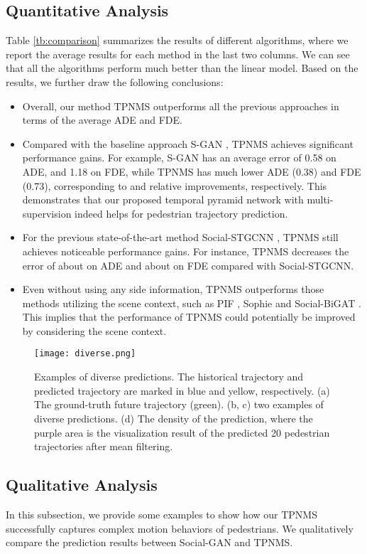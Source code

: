 \documentclass[letterpaper]{article} \usepackage{aaai21}  \usepackage{times}  \usepackage{helvet} \usepackage{courier}  \usepackage[hyphens]{url}  \usepackage{graphicx} \urlstyle{rm} \def\UrlFont{\rm}  \usepackage{natbib}  \usepackage{caption} \frenchspacing  \setlength{\pdfpagewidth}{8.5in}  \setlength{\pdfpageheight}{11in}
\begin{document}
\subsection{Quantitative Analysis}
Table \ref{tb:comparison} summarizes the results of different algorithms, where we report the average results for each method in the last two columns. We can see that all the algorithms perform much better than the linear model. Based on the results, we further draw the following conclusions:
\begin{itemize}
	\item Overall, our method TPNMS outperforms all the previous approaches in terms of the average ADE and FDE. 
	\item Compared with the baseline approach S-GAN \cite{gupta2018social}, TPNMS achieves significant performance gains. For example, S-GAN has an average error of 0.58 on ADE, and 1.18 on FDE, while TPNMS has much lower ADE (0.38) and FDE (0.73), corresponding to  and  relative improvements, respectively. This demonstrates that our proposed temporal pyramid network with multi-supervision indeed helps for pedestrian trajectory prediction.
	\item For the previous state-of-the-art method Social-STGCNN \cite{mohamed2020social}, TPNMS still achieves noticeable performance gains. For instance, TPNMS decreases the error of about  on ADE and about  on FDE compared with Social-STGCNN.
\item Even without using any side information, TPNMS outperforms those methods utilizing the scene context, such as PIF \cite{liang2019peeking}, Sophie \cite{sadeghian2019sophie} and Social-BiGAT \cite{socialbigat2019}. This implies that the performance of TPNMS could potentially be improved by considering the scene context.
\end{itemize}

\begin{figure*}[!t]
	\centering
	\texttt{[image: diverse.png]}
\caption{Examples of diverse predictions. The historical trajectory and predicted trajectory are marked in blue and yellow, respectively.
(a) The ground-truth future trajectory (green). (b, c) two examples of diverse predictions. (d) The density of the prediction, where the purple area is the visualization result of the predicted 20 pedestrian trajectories after mean filtering.}
	\label{fig:diverse}
\end{figure*}
\subsection{Qualitative Analysis}
In this subsection, we provide some examples to show how our TPNMS successfully captures complex motion behaviors of pedestrians.
We qualitatively compare the prediction results between Social-GAN and TPNMS.
\end{document}
